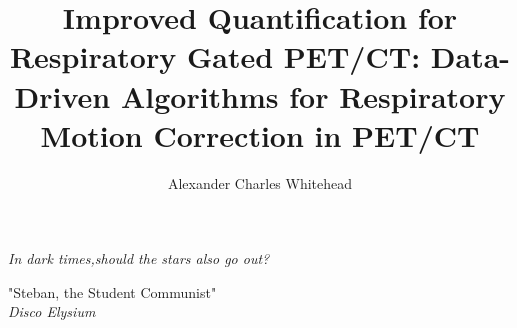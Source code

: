
\title{Improved Quantification for Respiratory Gated PET/CT: Data-Driven Algorithms for Respiratory Motion Correction in PET/CT}
\author{Alexander Charles Whitehead}

\maketitle




\thispagestyle{empty}
\vspace*{\fill}
\setlength{\epigraphwidth}{0.7\linewidth}
\renewcommand{\epigraphflush}{center}
\renewcommand{\epigraphsize}{\large}
\epigraph{\textit{In dark times,\newline should the stars also go out?}}%
         {"Steban, the Student Communist"\\ \textit{Disco Elysium}}
\vfill

